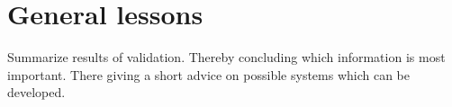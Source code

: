 \chapter{General lessons}
Summarize results of validation. Thereby concluding which information is most important. There giving a short advice on possible systems which can be developed.
